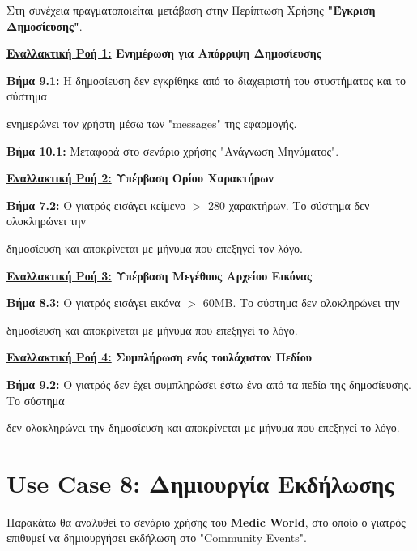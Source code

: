 \documentclass{article}
\begin{document}
Στη συνέχεια πραγματοποιείται μετάβαση στην Περίπτωση Χρήσης \textbf{"Έγκριση Δημοσίευσης"}.\vspace{0.2cm}

\textbf{\underline{Εναλλακτική Ροή 1:} Ενημέρωση για Απόρριψη Δημοσίευσης} \vspace{0.2cm}
\par \textbf{Βήμα 9.1:} Η δημοσίευση δεν εγκρίθηκε από το διαχειριστή του στυστήματος και το σύστημα \par ενημερώνει τον χρήστη μέσω των "messages" της εφαρμογής. \vspace{0.1cm}
\par \textbf{Βήμα 10.1:} Μεταφορά στο σενάριο χρήσης "Ανάγνωση Μηνύματος".

\textbf{\underline{Εναλλακτική Ροή 2:} Υπέρβαση Ορίου Χαρακτήρων} \vspace{0.2cm}
\par \textbf{Βήμα 7.2:} Ο γιατρός εισάγει κείμενο $>$ 280 χαρακτήρων. Το σύστημα δεν ολοκληρώνει την \par δημοσίευση και αποκρίνεται με μήνυμα που επεξηγεί τον λόγο. \vspace{0.2cm}

\textbf{\underline{Εναλλακτική Ροή 3:} Υπέρβαση Μεγέθους Αρχείου Εικόνας} \vspace{0.2cm}
\par \textbf{Βήμα 8.3:} Ο γιατρός εισάγει εικόνα $>$ 60MB. Το σύστημα δεν ολοκληρώνει την \par δημοσίευση και αποκρίνεται με μήνυμα που επεξηγεί το λόγο. \vspace{0.2cm}

\textbf{\underline{Εναλλακτική Ροή 4:} Συμπλήρωση ενός τουλάχιστον Πεδίου} \vspace{0.2cm}

\par \textbf{Βήμα 9.2:} Ο γιατρός δεν έχει συμπληρώσει έστω ένα από τα πεδία της δημοσίευσης. Το σύστημα \par δεν ολοκληρώνει την δημοσίευση και αποκρίνεται με μήνυμα που επεξηγεί το λόγο.

\section{Use Case 8: Δημιουργία Εκδήλωσης}

Παρακάτω θα αναλυθεί το σενάριο χρήσης του \textbf{Medic World}, στο οποίο ο γιατρός επιθυμεί να δημιουργήσει εκδήλωση στο "Community Events".
\end{document}
